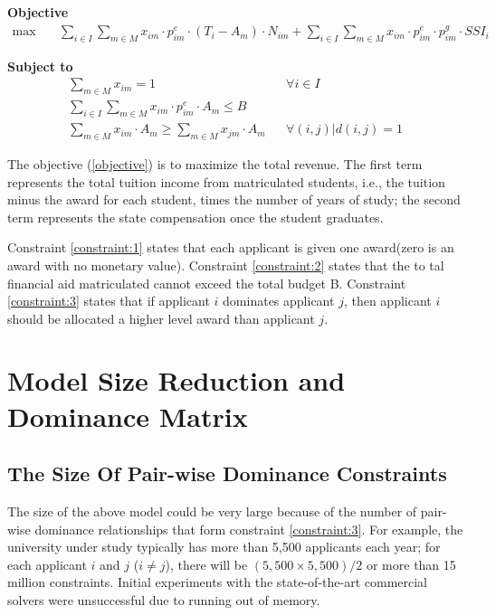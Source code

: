 \documentclass[12pt,english]{report}
\begin{document}
\hspace{-0.5cm}\textbf{Objective}
\begin{align}
\max \quad
& \sum_{i\in I} \sum_{m\in M} x_{im}\cdot p^e_{im}\cdot(T_i-A_m)\cdot N_{im}+
\sum_{i\in I} \sum_{m\in M} x_{im}\cdot p^e_{im} \cdot p^g_{im}\cdot SSI_i
\label{objective}
\end{align}

\hspace{-0.55cm}\textbf{Subject to}
\begin{align}
\sum_{m \in M}x_{im}=1 &&   \forall i\in I \label{constraint:1}  \\
\sum_{i \in I} \sum_{m\in M} x_{im}\cdot p^e_{im}\cdot A_m\leq B
\label{constraint:2}  \\
\sum_{m \in M} x_{im}\cdot A_m \geq \sum_{m \in M} x_{jm}\cdot A_m && \forall
(i,j)|d(i,j)=1 \label{constraint:3}
\end{align}

The objective (\ref{objective}) is to maximize the total revenue. The first term represents the total tuition income from matriculated students, i.e., the tuition minus the award for each student, times the number of years of study; the second term represents the state compensation once the student graduates.

Constraint \ref{constraint:1}  states that each applicant is given one award(zero is an award with no monetary value). Constraint \ref{constraint:2} states that the to tal financial aid matriculated cannot exceed the total budget B. Constraint  \ref{constraint:3} states that if applicant $i$ dominates applicant $j$, then applicant $i$ should be allocated a higher level award than applicant $j$.

\section{Model Size Reduction and Dominance Matrix}

\subsection{The Size Of Pair-wise Dominance Constraints}
\noindent The size of the above model could be very large because of the number of pair-wise dominance relationships that form constraint \ref{constraint:3}.  For example, the university under study typically has more than 5,500 applicants each year; for each applicant $i$ and $j$ ($i \neq j$), there will be $(5,500 \times 5,500) / 2$ or more than 15 million constraints. Initial experiments with the state-of-the-art commercial solvers were unsuccessful due to running out of memory.
\end{document}
